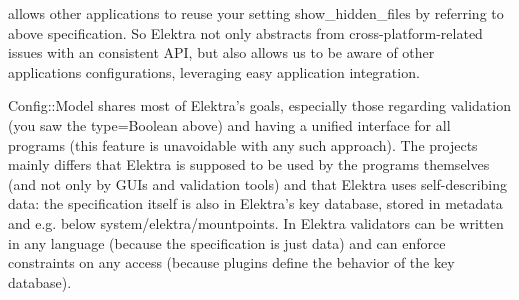 allows other applications to reuse your setting show\+\_\+hidden\+\_\+files by referring to above specification. So Elektra not only abstracts from cross-\/platform-\/related issues with an consistent API, but also allows us to be aware of other applications\textquotesingle{} configurations, leveraging easy application integration.

Config\+::\+Model shares most of Elektra’s goals, especially those regarding validation (you saw the type=Boolean above) and having a unified interface for all programs (this feature is unavoidable with any such approach). The projects mainly differs that Elektra is supposed to be used by the programs themselves (and not only by GUIs and validation tools) and that Elektra uses self-\/describing data\+: the specification itself is also in Elektra’s key database, stored in metadata and e.\+g. below system/elektra/mountpoints. In Elektra validators can be written in any language (because the specification is just data) and can enforce constraints on any access (because plugins define the behavior of the key database). 